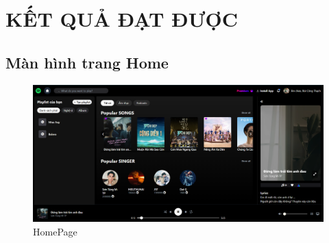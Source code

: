 \documentclass[a4paper]{article}
\begin{document}
 \section{KẾT QUẢ ĐẠT ĐƯỢC}
    \subsection{Màn hình trang Home}
        \begin{figure}[H]
            \centering
            \includegraphics[width=1\linewidth]{img/homeDemo.png}
            \caption{HomePage}
            \label{fig:enter-label}
        \end{figure}
\end{document}
